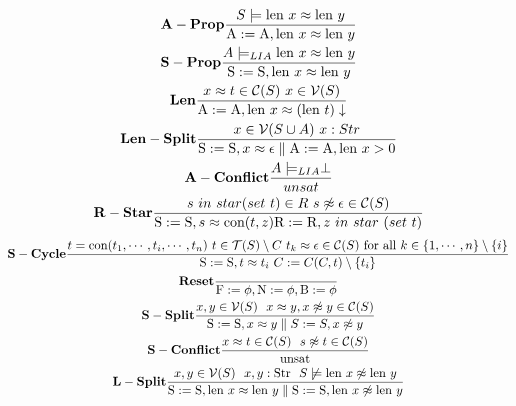 
  \begin{gather*}\label{eA1}
   \bold{A-Prop} \frac{ S \models  \textnormal{len} \ x \approx \textnormal{len} \ y}{ \textnormal{A} := \textnormal{A}, \textnormal{len} \ x \approx \textnormal{len} \ y}\\
    \bold{S-Prop} \frac{ A \models_{LIA}  \textnormal{len} \ x \approx \textnormal{len} \ y}{ \textnormal{S} := \textnormal{S}, \textnormal{len} \ x \approx \textnormal{len} \ y}\\
   \bold{Len} \frac{ x \approx t \in \mathcal{C}(S) \ x \in \mathcal{V}(S)}{ \textnormal{A} := \textnormal{A}, \textnormal{len} \ x \approx (\textnormal{len} \ t) \downarrow}\\
   \bold{Len-Split} \frac{ x \in \mathcal{V}(S \cup A) \ x: Str}{ \textnormal{S} := \textnormal{S}, x \approx \epsilon \parallel  \textnormal{A}:= \textnormal{A}, \textnormal{len} \ x > 0}\\
   \bold{A-Conflict} \frac{ A \models_{LIA} \perp }{ unsat}\\
   \bold{R-Star} \frac{ s \ in \ star( set \ t) \in R \ s  \not\approx \epsilon \in \mathcal{C}(S)}{ \textnormal{S}:= \textnormal{S}, s \approx \textnormal{con}(t,z) \textnormal{R}:= \textnormal{R}, z \ in \ star \ (set \ t)}
  \end{gather*}
  \begin{gather*}\label{eA1}   
   \bold{S-Cycle} \frac
   { t = \textnormal{con}(t_1, \cdots, t_i, \cdots, t_n) \ t \in \mathcal{T}(S) \setminus C \ t_k \approx \epsilon \in \mathcal{C}(S) \ \textnormal{for all} \ k \in \{1,\cdots,n\} \setminus \{ i \} }
   { \textnormal{S} := \textnormal{S}, t \approx t_i \ C:=C (C, t) \setminus \{t_i\}   }\\
    \bold{Reset} \frac{ }
    { \textnormal{F} := \phi, \textnormal{N} := \phi, \textnormal{B} := \phi}\\
     \bold{S-Split} \frac
     { x, y \in \mathcal{V}(S) \ \ x \approx y, x \not\approx y \in \mathcal{C}(S) }
     { \textnormal{S} := \textnormal{S}, x \approx y \parallel S:= S, x \not\approx y}\\
        \bold{S-Conflict} \frac
        { x \approx t \in \mathcal{C}(S) \ \ s \not\approx t \in \mathcal{C}(S)}
        { \textnormal{unsat}}\\
        \bold{L-Split} \frac
         { x, y \in \mathcal{V}(S) \ \ x,y: \textnormal{Str}  \ \  S \not\models \textnormal{len} \ x \not\approx \textnormal{len} \ y}
         { \textnormal{S}:= \textnormal{S}, \textnormal{len} \ x \approx \textnormal{len} \ y \parallel \textnormal{S}:=\textnormal{S}, \textnormal{len} \ x \not\approx \textnormal{len} \ y}
  \end{gather*}
